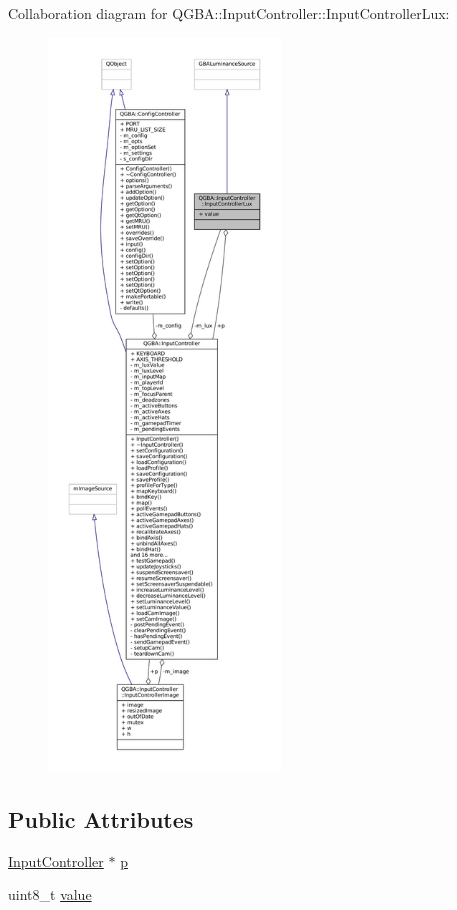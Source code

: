 Collaboration diagram for Q\+G\+BA\+:\+:Input\+Controller\+:\+:Input\+Controller\+Lux\+:
\nopagebreak
\begin{figure}[H]
\begin{center}
\leavevmode
\includegraphics[height=550pt]{struct_q_g_b_a_1_1_input_controller_1_1_input_controller_lux__coll__graph}
\end{center}
\end{figure}
\subsection*{Public Attributes}
\begin{DoxyCompactItemize}
\item 
\mbox{\hyperlink{class_q_g_b_a_1_1_input_controller}{Input\+Controller}} $\ast$ \mbox{\hyperlink{struct_q_g_b_a_1_1_input_controller_1_1_input_controller_lux_af5394f70f35e96de47fb464e412615aa}{p}}
\item 
uint8\+\_\+t \mbox{\hyperlink{struct_q_g_b_a_1_1_input_controller_1_1_input_controller_lux_a3dd93bd49b6f033c1cd6a920d108e62c}{value}}
\end{DoxyCompactItemize}


